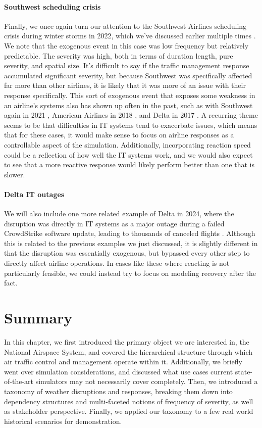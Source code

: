\paragraph{Southwest scheduling crisis} Finally, we once again turn our attention to the Southwest Airlines scheduling crisis during winter storms in 2022, which we've discussed earlier multiple times \cite{cnn_southwest_2022}. We note that the exogenous event in this case was low frequency but relatively predictable. The severity was high, both in terms of duration length, pure severity, and spatial size. It's difficult to say if the traffic management response accumulated significant severity, but because Southwest was specifically affected far more than other airlines, it is likely that it was more of an issue with their response specifically. This sort of exogenous event that exposes some weakness in an airline's systems also has shown up often in the past, such as with Southwest again in 2021 \cite{cnn_southwest_2021}, American Airlines in 2018 \cite{usatoday_aa_2018}, and Delta in 2017 \cite{cnn_delta_2017}. A recurring theme seems to be that difficulties in IT systems tend to exacerbate issues, which means that for these cases, it would make sense to focus on airline responses as a controllable aspect of the simulation. Additionally, incorporating reaction speed could be a reflection of how well the IT systems work, and we would also expect to see that a more reactive response would likely perform better than one that is slower. 

\paragraph{Delta IT outages} We will also include one more related example of Delta in 2024, where the disruption was directly in IT systems as a major outage during a failed CrowdStrike software update, leading to thousands of canceled flights \cite{cnbc_delta_crowdstrike_2024}. Although this is related to the previous examples we just discussed, it is slightly different in that the disruption was essentially exogenous, but bypassed every other step to directly affect airline operations. In cases like these where reacting is not particularly feasible, we could instead try to focus on modeling recovery after the fact.

\section{Summary}

In this chapter, we first introduced the primary object we are interested in, the National Airspace System, and covered the hierarchical structure through which air traffic control and management operate within it. Additionally, we briefly went over simulation considerations, and discussed what use cases current state-of-the-art simulators may not necessarily cover completely. Then, we introduced a taxonomy of weather disruptions and responses, breaking them down into dependency structures and multi-faceted notions of frequency of severity, as well as stakeholder perspective. Finally, we applied our taxonomy to a few real world historical scenarios for demonstration.